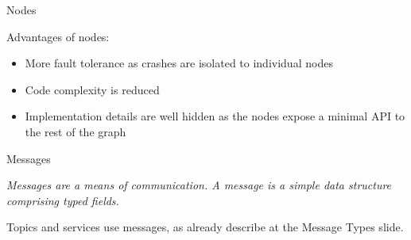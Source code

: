 \documentclass{beamer}
\begin{document}
\begin{frame}{Nodes}
		
	Advantages of nodes:
	
	\begin{itemize}
		\item More fault tolerance as crashes are isolated to individual nodes \\
		
		\item Code complexity is reduced
		\item Implementation details are well hidden as the nodes expose a minimal API to the rest of the graph 
	\end{itemize}
\end{frame}


\begin{frame}{Messages}
	\begin{definition}[Messages]
		\textit{Messages are a means of communication. A message is a simple data structure comprising typed fields. }
	\end{definition}
	
	Topics and services use messages, as already describe at the Message Types slide.
	
\end{frame}
\end{document}
